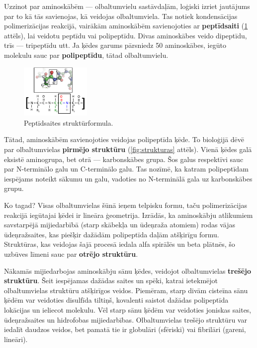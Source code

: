 \documentclass[12pt,a4paper]{article}
\newcommand{\figref}[1]{\ref{#1} attēls}
\begin{document}
Uzzinot par aminoskābēm — olbaltumvielu sastāvdaļām, loģiski izriet jautājums par to kā tās savienojas, kā veidojas olbaltumviela. Tas notiek kondensācijas polimerizācijas reakcijā, vairākām aminoskābēm savienojoties ar \textbf{peptīdsaiti} (\figref{fig:peptidsaite}), lai veidotu peptīdu vai polipeptīdu. Divas aminoskābes veido dipeptīdu, trīs — tripeptīdu utt. Ja ķēdes garums pārsniedz 50 aminoskābes, iegūto molekulu sauc par \textbf{polipeptīdu}, tātad olbaltumvielu.


\begin{figure}[H]
    \centering
    \includegraphics[width=0.3\textwidth]{atteli/proteīni 3.png}
    \caption{Peptīdsaites struktūrformula.}
    \label{fig:peptidsaite}
\end{figure}


Tātad, aminoskābēm savienojoties veidojas polipeptīda ķēde. To bioloģijā dēvē par olbaltumvielas \textbf{pirmējo struktūru} (\figref{fig:strukturas}). Vienā ķēdes galā eksistē aminogrupa, bet otrā — karbonskābes grupa. Šos galus respektīvi sauc par N-terminālo galu un C-terminālo galu. Tas nozīmē, ka katram polipeptīdam iespējams noteikt sākumu un galu, vadoties no N-terminālā gala uz karbonskābes grupu.

Ko tagad? Visas olbaltumvielas šūnā ieņem telpisku formu, taču polimerizācijas reakcijā iegūtajai ķēdei ir lineāra ģeometrija. Izrādās, ka aminoskābju atlikumiem savstarpējā mijiedarbībā (starp skābekļa un ūdeņraža atomiem) rodas vājas ūdeņražsaites, kas piešķir dažādām polipeptīda daļām atšķirīgu formu. Struktūras, kas veidojas šajā procesā iedala alfa spirālēs un beta plātnēs, šo uzbūves līmeni sauc par \textbf{otrējo struktūru}.

Nākamās mijiedarbojas aminoskābju sānu ķēdes, veidojot olbaltumvielas \textbf{trešējo struktūru}. Šeit iespējamas dažādas saites un spēki, katrai ietekmējot olbaltumvielas struktūru atšķirīgos veidos. Piemēram, starp divām cisteīna sānu ķēdēm var veidoties disulfīda tiltiņš, kovalenti saistot dažādas polipeptīda lokācijas un ieliecot molekulu. Vēl starp sānu ķēdēm var veidoties joniskas saites, ūdeņražsaites un hidrofobas mijiedarbības. Olbaltumvielas trešējo struktūru var iedalīt daudzos veidos, bet pamatā tie ir globulāri (sfēriski) vai fibrilāri (gareni, lineāri).
\end{document}
